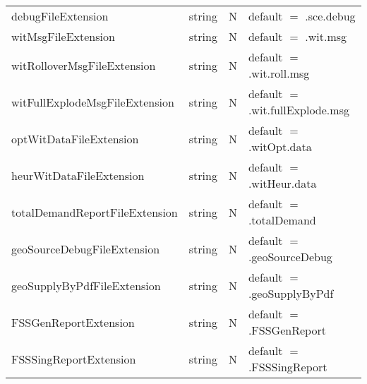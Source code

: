 \begin{tabular}{lllp{3.5in}}
debugFileExtension & string & N & default $=$ .sce.debug \\
witMsgFileExtension & string & N & default $=$ .wit.msg \\
witRolloverMsgFileExtension & string & N & default $=$ .wit.roll.msg \\
witFullExplodeMsgFileExtension & string & N & default 
        $=$ .wit.fullExplode.msg \\
optWitDataFileExtension & string & N & default $=$ .witOpt.data \\
heurWitDataFileExtension & string & N & default $=$ .witHeur.data \\
totalDemandReportFileExtension & string & N & default $=$ .totalDemand \\
geoSourceDebugFileExtension & string & N & default $=$ .geoSourceDebug \\
geoSupplyByPdfFileExtension & string & N & default $=$ .geoSupplyByPdf \\
FSSGenReportExtension & string & N & default $=$ .FSSGenReport \\
FSSSingReportExtension & string & N & default $=$ .FSSSingReport \\
\end{tabular}



